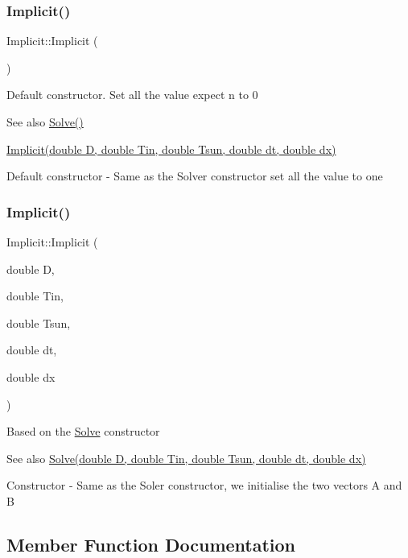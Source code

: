 \subsubsection{\texorpdfstring{Implicit()}{Implicit()}\hspace{0.1cm}{\footnotesize\ttfamily [1/2]}}
{\footnotesize\ttfamily Implicit\+::\+Implicit (\begin{DoxyParamCaption}{ }\end{DoxyParamCaption})}

Default constructor. Set all the value expect n to 0 \begin{DoxySeeAlso}{See also}
\hyperlink{class_solve_ac437f1307c9d4669205ac7d370a55ffc}{Solve()} 

\hyperlink{class_implicit_afe5ef51232ab8925009f584c679bdfce}{Implicit(double D, double Tin, double Tsun, double dt, double dx)}
\end{DoxySeeAlso}
Default constructor -\/ Same as the Solver constructor set all the value to one \mbox{\label{class_implicit_afe5ef51232ab8925009f584c679bdfce}} 
\subsubsection{\texorpdfstring{Implicit()}{Implicit()}\hspace{0.1cm}{\footnotesize\ttfamily [2/2]}}
{\footnotesize\ttfamily Implicit\+::\+Implicit (\begin{DoxyParamCaption}\item[{double}]{D,  }\item[{double}]{Tin,  }\item[{double}]{Tsun,  }\item[{double}]{dt,  }\item[{double}]{dx }\end{DoxyParamCaption})}

Based on the \hyperlink{class_solve}{Solve} constructor \begin{DoxySeeAlso}{See also}
\hyperlink{class_solve_a1e0efad6dcf6b09759dd38df7aa08db8}{Solve(double D, double Tin, double Tsun, double dt, double dx)}
\end{DoxySeeAlso}
Constructor -\/ Same as the Soler constructor, we initialise the two vectors A and B 

\subsection{Member Function Documentation}
\mbox{\label{class_implicit_a572fff2232977c83c432f993f37a7853}} 
